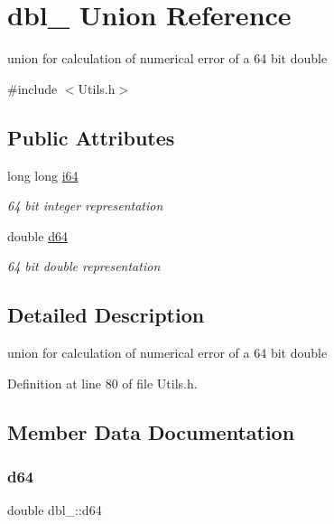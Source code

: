\hypertarget{uniondbl__64}{}\section{dbl\+\_ Union Reference}
\label{uniondbl__64}


union for calculation of numerical error of a 64 bit double  




{\ttfamily \#include $<$Utils.\+h$>$}

\subsection*{Public Attributes}
\begin{DoxyCompactItemize}
\item 
long long \hyperlink{uniondbl__64_a6f97524990aa26aaa1618b7288301841}{i64}
\begin{DoxyCompactList}\small\item\em 64 bit integer representation \end{DoxyCompactList}\item 
double \hyperlink{uniondbl__64_a6007036e300f1924037fc32c8bec660c}{d64}
\begin{DoxyCompactList}\small\item\em 64 bit double representation \end{DoxyCompactList}\end{DoxyCompactItemize}


\subsection{Detailed Description}
union for calculation of numerical error of a 64 bit double 

Definition at line 80 of file Utils.\+h.



\subsection{Member Data Documentation}
\mbox{\label{uniondbl__64_a6007036e300f1924037fc32c8bec660c}} 
\subsubsection{\texorpdfstring{d64}{d64}}
{\footnotesize\ttfamily double dbl\+\_\+::d64}



